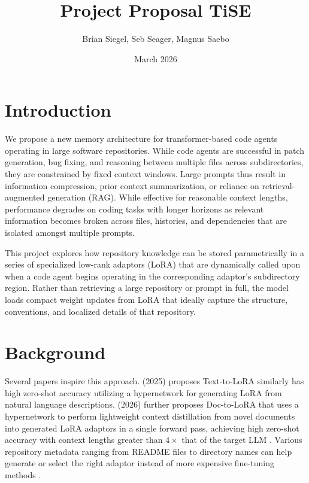 \documentclass{article}
\title{Project Proposal TiSE}
\author{Brian Siegel, Seb Seager, Magnus Saebo}
\date{March 2026}
\begin{document}
\maketitle

\section{Introduction}

We propose a new memory architecture for transformer-based code agents operating in large software repositories. While code agents are successful in patch generation, bug fixing, and reasoning between multiple files across subdirectories, they are constrained by fixed context windows. Large prompts thus result in information compression, prior context summarization, or reliance on retrieval-augmented generation (RAG). While effective for reasonable context lengths, performance degrades on coding tasks with longer horizons as relevant information becomes broken across files, histories, and dependencies that are isolated amongst multiple prompts.

This project explores how repository knowledge can be stored parametrically in a series of specialized low-rank adaptors (LoRA) that are dynamically called upon when a code agent begins operating in the corresponding adaptor's subdirectory region. Rather than retrieving a large repository or prompt in full, the model loads compact weight updates from LoRA that ideally capture the structure, conventions, and localized details of that repository. 

\section{Background}
Several papers inspire this approach. \citeauthor{charakorn2025texttolorainstanttransformeradaption} (2025) proposes Text-to-LoRA similarly has high zero-shot accuracy utilizing a hypernetwork for generating LoRA from natural language descriptions. \citeauthor{doctolora} (2026) further proposes Doc-to-LoRA that uses a hypernetwork to perform lightweight context distillation from novel documents into generated LoRA adaptors in a single forward pass, achieving high zero-shot accuracy with context lengths greater than $4\times $ that of the target LLM \cite{doctolora}. Various repository metadata ranging from README files to directory names can help generate or select the right adaptor instead of more expensive fine-tuning methods \cite{charakorn2025texttolorainstanttransformeradaption}.
\end{document}
